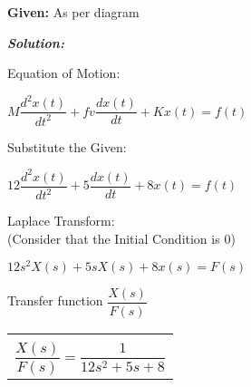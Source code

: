 \documentclass[11pt,letterpaper]{article}
\begin{document}
\noindent\textbf{Given:} As per diagram

\vspace{12pt}
\noindent\textit{\textbf{Solution:}}

\vspace{12pt}

Equation of Motion:\\
\begin{center}
	$M\dfrac{d^2x(t)}{dt^2}+fv\dfrac{dx(t)}{dt}+Kx(t)=f(t)$\\
\end{center}
Substitute the Given:\\
\begin{center}
	$12\dfrac{d^2x(t)}{dt^2}+5\dfrac{dx(t)}{dt}+8x(t)=f(t)$\\
\end{center}
Laplace Transform:\\[12pt]
(Consider that the Initial Condition is $0$)\\
\begin{center}
	$12s^2X(s)+5sX(s)+8x(s)=F(s)$\\
\end{center}
Transfer function $\dfrac{X(s)}{F(s)}$\\
\begin{center}
	\begin{tabular}{|c|}
		\hline \\
		$\dfrac{X(s)}{F(s)}=\dfrac{1}{12s^2+5s+8}$	\\ [12pt]
	\hline
	\end{tabular}	
\end{center}

\clearpage
\end{document}
